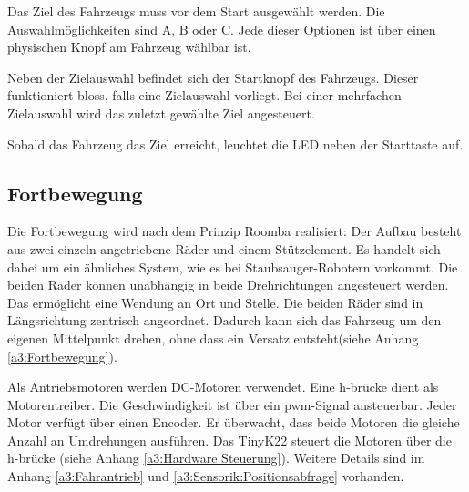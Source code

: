 \documentclass[../main.tex]{subfiles}
\begin{document}
Das Ziel des Fahrzeugs muss vor dem Start ausgewählt werden. Die Auswahlmöglichkeiten sind A, B oder C. Jede dieser Optionen ist über einen physischen Knopf am Fahrzeug wählbar ist.

Neben der Zielauswahl befindet sich der Startknopf des Fahrzeugs. Dieser funktioniert bloss, falls eine Zielauswahl vorliegt. Bei einer mehrfachen Zielauswahl wird das zuletzt gewählte Ziel angesteuert.

Sobald das Fahrzeug das Ziel erreicht, leuchtet die LED neben der Starttaste auf.

\subsection{Fortbewegung} 

Die Fortbewegung wird nach dem Prinzip Roomba realisiert: Der Aufbau besteht aus zwei einzeln angetriebene Räder und einem Stützelement. Es handelt sich dabei um ein ähnliches System, wie es bei Staubsauger-Robotern vorkommt. Die beiden Räder können unabhängig in beide Drehrichtungen angesteuert werden. Das ermöglicht eine Wendung an Ort und Stelle. Die beiden Räder sind in Längsrichtung zentrisch angeordnet. Dadurch kann sich das Fahrzeug um den eigenen Mittelpunkt drehen, ohne dass ein Versatz entsteht(siehe Anhang \ref{a3:Fortbewegung}).

Als Antriebsmotoren werden DC-Motoren verwendet. Eine \gls{h-brücke} dient als Motorentreiber. Die Geschwindigkeit ist über ein \gls{pwm}-Signal ansteuerbar. Jeder Motor verfügt über einen Encoder. Er überwacht, dass beide Motoren die gleiche Anzahl an Umdrehungen ausführen. Das TinyK22 steuert die Motoren über die \gls{h-brücke} (siehe Anhang \ref{a3:Hardware Steuerung}). Weitere Details sind im Anhang \ref{a3:Fahrantrieb} und \ref{a3:Sensorik:Positionsabfrage} vorhanden.
\end{document}

